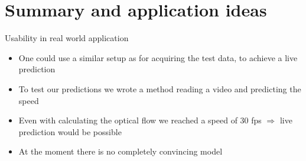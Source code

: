 \section{Summary and application ideas}

\begin{frame}{Usability in real world application}
	\begin{itemize}
		\item One could use a similar setup as for acquiring the test data, to achieve a live prediction
		\item To test our predictions we wrote a method reading a video and predicting the speed
		\item Even with calculating the optical flow we reached a speed of 30 fps $\Rightarrow$ live prediction would be possible
		\item At the moment there is no completely convincing model
	\end{itemize}
\end{frame}